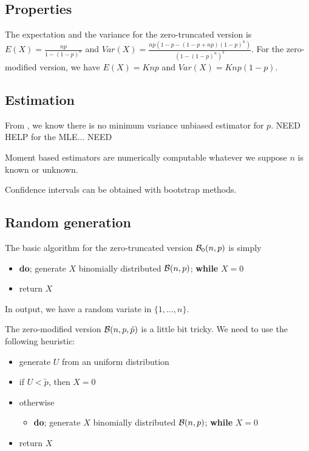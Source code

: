\subsection{Properties}
The expectation and the variance for the zero-truncated version is $E(X) = \frac{np}{1-(1-p)^n}$ and $Var(X)=\frac{np(1-p-(1-p+np)(1-p)^n)}{(1-(1-p)^n)^2}$. For the zero-modified version, we have $E(X)=Knp$ and $Var(X)=Knp(1-p)$.

\subsection{Estimation}
From \cite{cacoullos}, we know there is no minimum variance unbiased estimator for $p$. NEED HELP for the MLE... NEED \cite{thomasgart}

Moment based estimators are numerically computable whatever we suppose $n$ is known or unknown. 

Confidence intervals can be obtained with bootstrap methods.



\subsection{Random generation}
The basic algorithm for the zero-truncated version $\mathcal B_0(n,p)$ is simply
\begin{itemize}
\item \textbf{do}; generate $X$ binomially distributed $\mathcal B(n,p)$; \textbf{while} $X=0$
\item return $X$	
\end{itemize}
In output, we have a random variate in $\{1,\dots,n\}$.

The zero-modified version $\mathcal B(n,p,\tilde p)$ is a little bit tricky. We need to use the following heuristic:
\begin{itemize}
\item generate $U$ from an uniform distribution
\item if $U< \tilde p$, then $X=0$
\item otherwise 
	\begin{itemize}
	\item \textbf{do}; generate $X$ binomially distributed $\mathcal B(n,p)$; \textbf{while} $X=0$
	\end{itemize}
\item return $X$	
\end{itemize}


